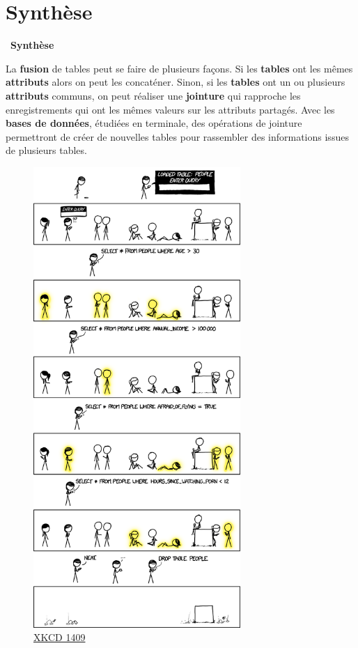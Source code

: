 \documentclass[
  11pt,
]{article}
\newenvironment{synthese}
{\par \medskip   \noindent   
\begin{bclogo}[arrondi =0.1,   noborder = true, logo=\bccle, marge=4]{~\textbf{Synthèse}   }  \par}
{
\end{bclogo}
 \par \bigskip }
\begin{document}
\hypertarget{synthuxe8se}{%
\section{Synthèse}\label{synthuxe8se}}

\begin{synthese}{}

La \textbf{fusion} de tables peut se faire de plusieurs façons. Si les
\textbf{tables} ont les mêmes \textbf{attributs} alors on peut les
concaténer. Sinon, si les \textbf{tables} ont un ou plusieurs
\textbf{attributs} communs, on peut réaliser une \textbf{jointure} qui
rapproche les enregistrements qui ont les mêmes valeurs sur les
attributs partagés. Avec les \textbf{bases de données}, étudiées en
terminale, des opérations de jointure permettront de créer de nouvelles
tables pour rassembler des informations issues de plusieurs tables.

\end{synthese}

\begin{figure}
\centering
\includegraphics[width=0.7\textwidth,height=\textheight]{Images/query.png}
\caption{\href{https://www.explainxkcd.com/wiki/index.php/1409:_Query}{XKCD
1409}}
\end{figure}
\end{document}
